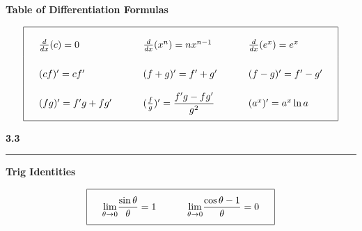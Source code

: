 \documentclass{article}
\begin{document}
\begin{center}
\Large\textbf{Table of Differentiation Formulas}
\begin{large}
\[\arraycolsep=16pt\def\arraystretch{2.5}
\begin{array}{| l l l |}
	\hline
	\frac{d}{dx} (c) = 0 & \frac{d}{dx} (x^n) = nx^{n-1} & \frac{d}{dx} (e^x) = e^x \\
	(cf)' = cf' & (f+g)' = f' + g' & (f-g)' = f'-g' \\
	(fg)' = f'g + fg' & (\frac{f}{g})' = \dfrac{f'g - fg'}{g^2} & (a^x)' = a^x \ln a \\
	[\medskipamount]
	\hline
\end{array}
\]
\end{large}
\end{center}
\pagebreak

\begin{center}
\Large\textbf{3.3}

\noindent\hfill\rule{0.3\textwidth}{.4pt}\hfill
\vspace{12pt}

\large\textbf{Trig Identities}\\
\end{center}
\[\arraycolsep=16pt\def\arraystretch{2.5}
\begin{array}{|c c|}
	\hline
	\underset{\theta \to 0}{\lim} \dfrac{\sin\theta}{\theta} = 1 &
	\underset{\theta \to 0}{\lim} \dfrac{\cos\theta - 1}{\theta} = 0 \\
	[\medskipamount]
	\hline
\end{array}
	\]
\vspace{12pt}
\end{document}
